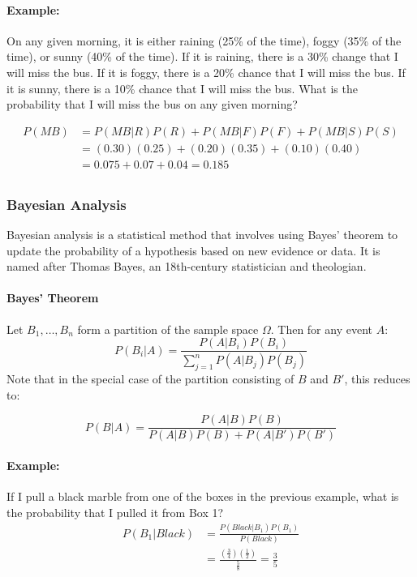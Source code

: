 \paragraph*{Example:}
On any given morning, it is either raining (25\% of the time), foggy (35\% of the time), or sunny (40\% of the time).
If it is raining, there is a 30\% change that I will miss the bus. If it is foggy, there is a 20\%
chance that I will miss the bus. If it is sunny, there is a 10\% chance that I will miss the bus.
What is the probability that I will miss the bus on any given morning?

\begin{align*}
    P(MB) &= P(MB|R)P(R) + P(MB|F)P(F) + P(MB|S)P(S) \\
    &= (0.30)(0.25) + (0.20)(0.35) + (0.10)(0.40) \\
    &= 0.075 + 0.07 + 0.04 = 0.185 \\
\end{align*}

\subsubsection*{Bayesian Analysis}
Bayesian analysis is a statistical method that involves using Bayes' theorem to update the probability of a hypothesis
based on new evidence or data. It is named after Thomas Bayes, an 18th-century statistician and theologian.

\paragraph*{Bayes' Theorem}
Let $B_1,\ldots,B_n$ form a partition of the sample space $\Omega$. Then for any event $A$:
\[
    P(B_i|A) = \frac{P(A|B_i)P(B_i)}{\sum_{j=1}^{n} P(A|B_j)P(B_j)}
\]
Note that in the special case of the partition consisting of $B$ and $B'$, this reduces to:

\[
    P(B|A) = \frac{P(A|B)P(B)}{P(A|B)P(B) + P(A|B')P(B')}
\]

\paragraph*{Example:}
If I pull a black marble from one of the boxes in the previous example, what is the probability that I pulled it from Box 1?
\begin{align*}
    P(B_1|Black) &= \frac{P(Black|B_1)P(B_1)}{P(Black)} \\
    &= \frac{(\frac{3}{4})(\frac{1}{2})}{\frac{5}{8}} = \frac{3}{5}
\end{align*}

